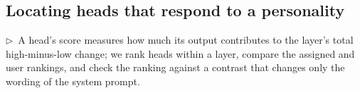 \documentclass[11pt]{article}
\newcommand{\flow}[1]{\par\noindent\textcolor{blue!60!black}{\small$\triangleright$\ #1}\par\medskip}
\begin{document}
\subsection{Locating heads that respond to a personality}
\flow{A head's score measures how much its output contributes to the layer's total high-minus-low change; we rank heads within a layer, compare the assigned and user rankings, and check the ranking against a contrast that changes only the wording of the system prompt.}
\end{document}
